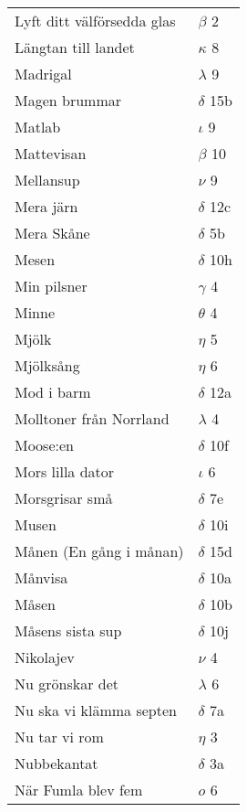 \documentclass[a6paper,10pt]{article}
\begin{document}
\newpage
\setlength{\oddsidemargin}{-0.37in}
\begin{table}[!h]
\begin{tabular}{l l}
Lyft ditt välförsedda glas&	$\beta$ 2\\
Längtan till landet&	$\kappa$ 8\\
Madrigal&	$\lambda$ 9\\
Magen brummar&	$\delta$ 15b\\
Matlab	&$\iota$ 9\\
Mattevisan&	$\beta$ 10\\
Mellansup	&$\nu$ 9\\
Mera järn&	$\delta$ 12c\\
Mera Skåne	&$\delta$ 5b\\
Mesen&	$\delta$ 10h\\
Min pilsner	&$\gamma$ 4\\
Minne&	$\theta$ 4\\
Mjölk	&$\eta$ 5\\
Mjölksång&	$\eta$ 6\\
Mod i barm&$\delta$ 12a\\
Molltoner från Norrland&	$\lambda$ 4\\
Moose:en	&$\delta$ 10f\\
Mors lilla dator&	$\iota$ 6\\
Morsgrisar små&	$\delta$ 7e\\
Musen	&$\delta$ 10i\\
Månen (En gång i månan)&	$\delta$ 15d\\
Månvisa&	$\delta$ 10a\\
Måsen	&$\delta$ 10b\\
Måsens sista sup&	$\delta$ 10j\\
Nikolajev	&$\nu$ 4\\
Nu grönskar det&	$\lambda$ 6\\
Nu ska vi klämma septen	&$\delta$ 7a\\
Nu tar vi rom&	$\eta$ 3\\
Nubbekantat&	$\delta$ 3a\\
När Fumla blev fem&  $o$ 6\\
\end{tabular}
\end{table}
\end{document}
